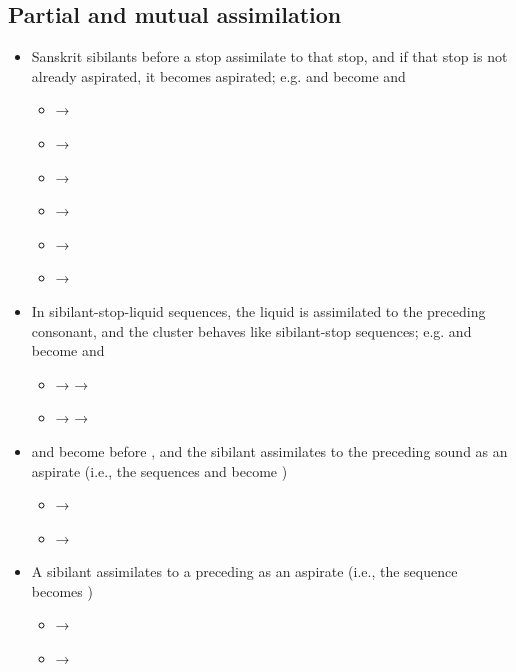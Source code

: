 \subsection*{Partial and mutual assimilation}

\begin{itemize}
	\item Sanskrit sibilants before a stop assimilate to that stop, and if that stop is not already aspirated, it becomes aspirated; e.g.  and  become  and 
		\begin{itemize}
			\item {} → 
			\item {} → 
			\item {} → 
			\item {} → 
			\item {} → 
			\item {} → 
		\end{itemize}
	\item In sibilant-stop-liquid sequences, the liquid is assimilated to the preceding consonant, and the cluster behaves like sibilant-stop sequences; e.g.  and  become  and 
		\begin{itemize}
			\item {} →  → 
			\item {} →  → 
		\end{itemize}
	\item {} and  become  before , and the sibilant assimilates to the preceding sound as an aspirate (i.e., the sequences  and  become )
		\begin{itemize}
			\item {} → 
			\item {} → 
		\end{itemize}
	\item A sibilant assimilates to a preceding  as an aspirate (i.e., the sequence  becomes )
		\begin{itemize}
			\item {} → 
			\item {} → 
		\end{itemize}

\end{itemize}
